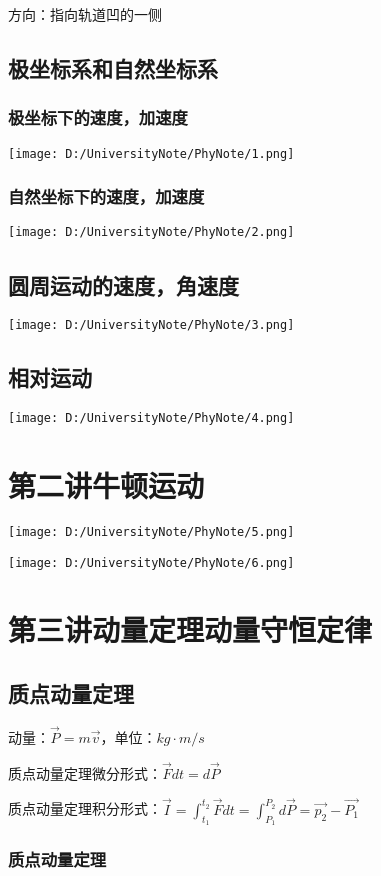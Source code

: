 \documentclass[UTF8]{article}
\begin{document}
    \;\;方向：指向轨道凹的一侧

\subsection{极坐标系和自然坐标系}
\subsubsection{极坐标下的速度，加速度}
\texttt{[image: D:/UniversityNote/PhyNote/1.png]}
\subsubsection{自然坐标下的速度，加速度}
\texttt{[image: D:/UniversityNote/PhyNote/2.png]}
\subsection{圆周运动的速度，角速度}
\texttt{[image: D:/UniversityNote/PhyNote/3.png]}
\subsection{相对运动}
\texttt{[image: D:/UniversityNote/PhyNote/4.png]}
\newpage
\section{第二讲\;\;牛顿运动}
\texttt{[image: D:/UniversityNote/PhyNote/5.png]}

\texttt{[image: D:/UniversityNote/PhyNote/6.png]}
\newpage
\section{第三讲\;\;动量定理\;\;动量守恒定律}
\subsection{质点动量定理}

    动量：$\vec{P} = m\vec{v}$，单位：$kg\cdot m/s$
    
    质点动量定理微分形式：$\vec{F}dt = d\vec{P}$

    质点动量定理积分形式：$\vec{I} = \int_{t_1}^{t_2}\vec{F}dt = \int_{P_1}^{P_2}d\vec{P} = \vec{p_2} - \vec{P_1}$

\subsubsection{质点动量定理}
\end{document}
